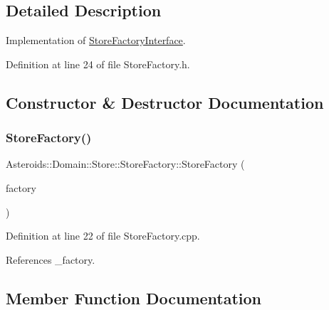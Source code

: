 \subsection{Detailed Description}
Implementation of \hyperlink{classAsteroids_1_1Domain_1_1Store_1_1StoreFactoryInterface}{Store\+Factory\+Interface}. 

Definition at line 24 of file Store\+Factory.\+h.



\subsection{Constructor \& Destructor Documentation}
\mbox{\label{classAsteroids_1_1Domain_1_1Store_1_1StoreFactory_a10b3738650544e33597f5dea25cc4684}} 
\subsubsection{\texorpdfstring{Store\+Factory()}{StoreFactory()}}
{\footnotesize\ttfamily Asteroids\+::\+Domain\+::\+Store\+::\+Store\+Factory\+::\+Store\+Factory (\begin{DoxyParamCaption}\item[{std\+::shared\+\_\+ptr$<$ \hyperlink{classAsteroids_1_1Domain_1_1Factory_1_1FactoryInterface}{Asteroids\+::\+Domain\+::\+Factory\+::\+Factory\+Interface} $>$}]{factory }\end{DoxyParamCaption})}



Definition at line 22 of file Store\+Factory.\+cpp.



References \+\_\+factory.



\subsection{Member Function Documentation}
\mbox{\label{classAsteroids_1_1Domain_1_1Store_1_1StoreFactory_a2b705db9646ef39d911e31ddc26d2131}} 
